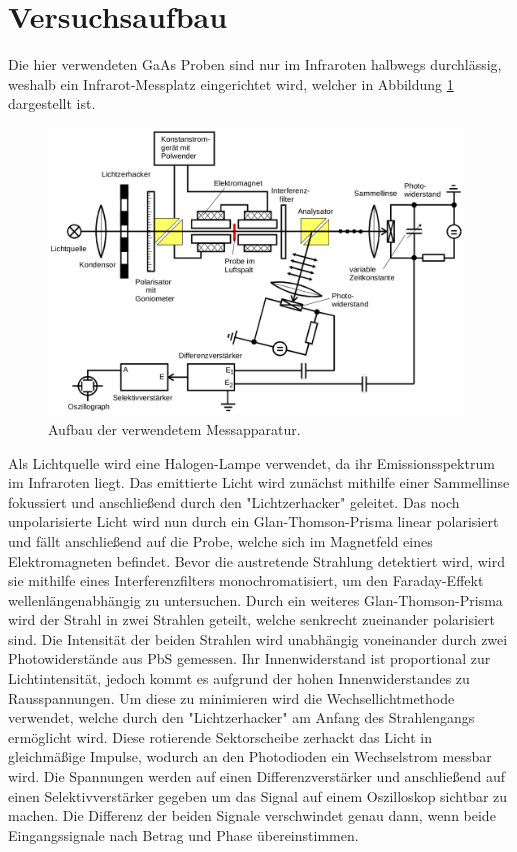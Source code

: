 \section{Versuchsaufbau}

Die hier verwendeten GaAs Proben sind nur im Infraroten halbwegs durchlässig, weshalb ein
Infrarot-Messplatz eingerichtet wird, welcher in Abbildung \ref{fig:aufbau} dargestellt ist.

\begin{figure}[H]
  \centering
  \includegraphics[width=11cm]{Aufbau.png}
  \caption{Aufbau der verwendetem Messapparatur.}
  \label{fig:aufbau}
\end{figure}

Als Lichtquelle wird eine Halogen-Lampe verwendet, da ihr Emissionsspektrum im Infraroten liegt.
Das emittierte Licht wird zunächst mithilfe einer Sammellinse fokussiert und anschließend durch
den "Lichtzerhacker" geleitet. Das noch unpolarisierte Licht wird nun durch ein Glan-Thomson-Prisma
linear polarisiert und fällt anschließend auf die Probe, welche sich im Magnetfeld eines
Elektromagneten befindet.
Bevor die austretende Strahlung detektiert wird, wird sie mithilfe eines Interferenzfilters monochromatisiert,
um den Faraday-Effekt wellenlängenabhängig zu untersuchen. Durch ein weiteres Glan-Thomson-Prisma wird der
Strahl in zwei Strahlen geteilt, welche senkrecht zueinander polarisiert sind. Die Intensität der beiden
Strahlen wird unabhängig voneinander durch zwei Photowiderstände aus PbS gemessen. Ihr Innenwiderstand ist
proportional zur Lichtintensität, jedoch kommt es aufgrund der hohen Innenwiderstandes zu Rausspannungen.
Um diese zu minimieren wird die Wechsellichtmethode verwendet, welche durch den "Lichtzerhacker" am Anfang des
Strahlengangs ermöglicht wird. Diese rotierende Sektorscheibe zerhackt das Licht in gleichmäßige Impulse, wodurch
an den Photodioden ein Wechselstrom messbar wird. Die Spannungen werden auf einen Differenzverstärker und anschließend auf
einen Selektivverstärker gegeben um das Signal auf einem Oszilloskop sichtbar zu machen.
Die Differenz der beiden Signale verschwindet genau dann, wenn beide Eingangssignale nach Betrag und Phase
übereinstimmen.


